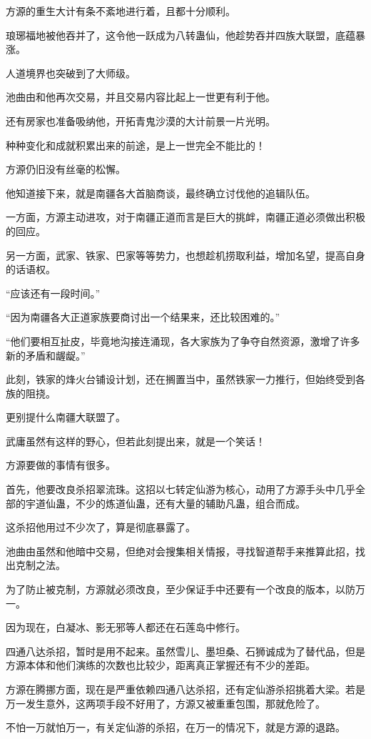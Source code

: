 \begin{this_body}
方源的重生大计有条不紊地进行着，且都十分顺利。

琅琊福地被他吞并了，这令他一跃成为八转蛊仙，他趁势吞并四族大联盟，底蕴暴涨。

人道境界也突破到了大师级。

池曲由和他再次交易，并且交易内容比起上一世更有利于他。

还有房家也准备吸纳他，开拓青鬼沙漠的大计前景一片光明。

种种变化和成就积累出来的前途，是上一世完全不能比的！

方源仍旧没有丝毫的松懈。

他知道接下来，就是南疆各大首脑商谈，最终确立讨伐他的追辑队伍。

一方面，方源主动进攻，对于南疆正道而言是巨大的挑衅，南疆正道必须做出积极的回应。

另一方面，武家、铁家、巴家等等势力，也想趁机捞取利益，增加名望，提高自身的话语权。

“应该还有一段时间。”

“因为南疆各大正道家族要商讨出一个结果来，还比较困难的。”

“他们要相互扯皮，毕竟地沟接连涌现，各大家族为了争夺自然资源，激增了许多新的矛盾和龌龊。”

此刻，铁家的烽火台铺设计划，还在搁置当中，虽然铁家一力推行，但始终受到各族的阻挠。

更别提什么南疆大联盟了。

武庸虽然有这样的野心，但若此刻提出来，就是一个笑话！

方源要做的事情有很多。

首先，他要改良杀招翠流珠。这招以七转定仙游为核心，动用了方源手头中几乎全部的宇道仙蛊，不少的炼道仙蛊，还有大量的辅助凡蛊，组合而成。

这杀招他用过不少次了，算是彻底暴露了。

池曲由虽然和他暗中交易，但绝对会搜集相关情报，寻找智道帮手来推算此招，找出克制之法。

为了防止被克制，方源就必须改良，至少保证手中还要有一个改良的版本，以防万一。

因为现在，白凝冰、影无邪等人都还在石莲岛中修行。

四通八达杀招，暂时是用不起来。虽然雪儿、墨坦桑、石狮诚成为了替代品，但是方源本体和他们演练的次数也比较少，距离真正掌握还有不少的差距。

方源在腾挪方面，现在是严重依赖四通八达杀招，还有定仙游杀招挑着大梁。若是万一发生意外，这两项手段不好用了，方源又被重重包围，那就危险了。

不怕一万就怕万一，有关定仙游的杀招，在万一的情况下，就是方源的退路。


\end{this_body}
